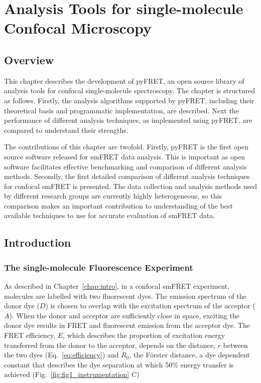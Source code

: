 \chapter{Analysis Tools for single-molecule Confocal Microscopy}
\label{chap:pyfret}
\section{Overview}
This chapter describes the development of pyFRET, an open source library of analysis tools for confocal single-molecule spectroscopy. The chapter is structured as follows. Firstly, the analysis algorithms supported by pyFRET, including their theoretical basis and programmatic implementation, are described. Next the performance of different analysis techniques, as implemented using pyFRET, are compared to understand their strengths. 

The contributions of this chapter are twofold. Firstly, pyFRET is the first open source software released for smFRET data analysis. This is important as open software facilitates effective benchmarking and comparison of different analysis methods. Secondly, the first detailed comparison of different analysis techniques for confocal smFRET is presented. The data collection and analysis methods used by different research groups are currently highly heterogeneous, so this comparison makes an important contribution to understanding of the best available techniques to use for accurate evaluation of smFRET data.  

\section{Introduction}
\subsection{The single-molecule Fluorescence Experiment}

As described in Chapter~\ref{chap:intro}, in a confocal smFRET experiment, molecules are labelled with two fluorescent dyes. The emission spectrum of the donor dye ($D$) is chosen to overlap with the excitation spectrum of the acceptor ($A$). When the donor and acceptor are sufficiently close in space, exciting the donor dye results in FRET and fluorescent emission from the acceptor dye.  The FRET efficiency, $E$, which describes the proportion of excitation energy transferred from the donor to the acceptor, depends on the distance, $r$ between the two dyes (Eq.~\ref{eq:efficiency}) and $R_0$, the F\"{o}rster distance, a dye dependent constant that describes the dye separation at which 50\% energy transfer is achieved (Fig.~\ref{fig:fig1_instrumentation} C)

